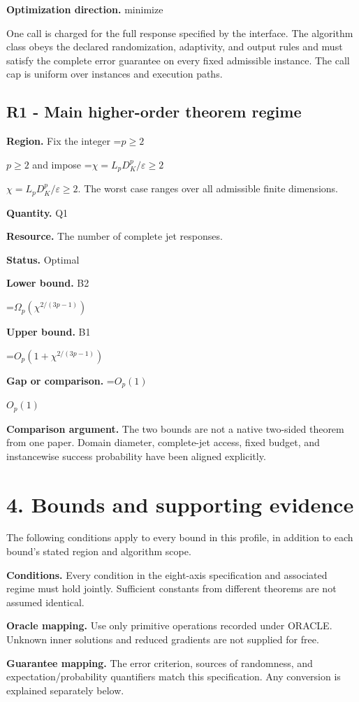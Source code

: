 \documentclass[10pt,a4paper]{article}
\newcommand{\AtlasMath}[1]{\par\begingroup\centering\setbox0=\hbox{$\displaystyle #1$}\ifdim\wd0>1.4\linewidth\typeout{ATLAS WIDE FORMULA: \the\wd0}\fi\ifdim\wd0>\linewidth\resizebox{\linewidth}{!}{\box0}\else\box0\fi\par\endgroup}
\newcommand{\AtlasInlineMath}[1]{\begingroup\setbox0=\hbox{$#1$}\ifdim\wd0>.4\linewidth\endgroup\AtlasMath{#1}\else\endgroup$#1$\fi}
\begin{document}
\textbf{Optimization direction.} minimize

One call is charged for the full response specified by the interface. The algorithm class obeys the declared randomization, adaptivity, and output rules and must satisfy the complete error guarantee on every fixed admissible instance. The call cap is uniform over instances and execution paths.

\subsection{R1 - Main higher-order theorem regime}
\textbf{Region.} Fix the integer \AtlasInlineMath{p\ge2} and impose \AtlasInlineMath{\chi=L_pD_K^p/\varepsilon\ge2}. The worst case ranges over all admissible finite dimensions.

\textbf{Quantity.} Q1

\textbf{Resource.} The number of complete jet responses.

\textbf{Status.} Optimal

\textbf{Lower bound.} B2

\AtlasMath{\Omega_p(\chi^{2/(3p-1)})}
\textbf{Upper bound.} B1

\AtlasMath{O_p(1+\chi^{2/(3p-1)})}
\textbf{Gap or comparison.} \AtlasInlineMath{O_p(1)}

\textbf{Comparison argument.} The two bounds are not a native two-sided theorem from one paper. Domain diameter, complete-jet access, fixed budget, and instancewise success probability have been aligned explicitly.

\section{4. Bounds and supporting evidence}
The following conditions apply to every bound in this profile, in addition to each bound's stated region and algorithm scope.

\textbf{Conditions.} Every condition in the eight-axis specification and associated regime must hold jointly. Sufficient constants from different theorems are not assumed identical.

\textbf{Oracle mapping.} Use only primitive operations recorded under ORACLE. Unknown inner solutions and reduced gradients are not supplied for free.

\textbf{Guarantee mapping.} The error criterion, sources of randomness, and expectation/probability quantifiers match this specification. Any conversion is explained separately below.
\end{document}
